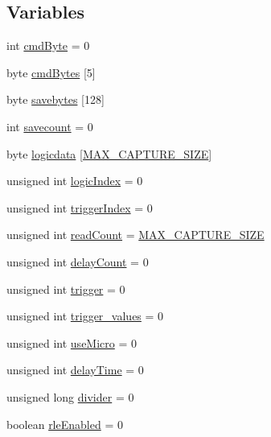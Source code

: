 \subsection*{Variables}
\begin{DoxyCompactItemize}
\item 
int \hyperlink{logic__analyzer_8ino_a12614e45101c87be446e3215f9828ea7}{cmd\-Byte} = 0
\item 
byte \hyperlink{logic__analyzer_8ino_a1c084ba1cb81467fe3909061a10bcc3c}{cmd\-Bytes} \mbox{[}5\mbox{]}
\item 
byte \hyperlink{logic__analyzer_8ino_a244e6b00c44167b679f20c536bbfd847}{savebytes} \mbox{[}128\mbox{]}
\item 
int \hyperlink{logic__analyzer_8ino_a6082b63b4ed702f0c1c36683dfeedffd}{savecount} = 0
\item 
byte \hyperlink{logic__analyzer_8ino_acf1380cc8a402895cf2cbab1a4892637}{logicdata} \mbox{[}\hyperlink{logic__analyzer_8ino_a9fc5489cac12001b6bd8f4327f19d8d3}{M\-A\-X\-\_\-\-C\-A\-P\-T\-U\-R\-E\-\_\-\-S\-I\-Z\-E}\mbox{]}
\item 
unsigned int \hyperlink{logic__analyzer_8ino_a3ebca88c99ad4e7a44e7c1a15f70d7b9}{logic\-Index} = 0
\item 
unsigned int \hyperlink{logic__analyzer_8ino_a5c00415a1614fd9a8ec4d81709ab7a7c}{trigger\-Index} = 0
\item 
unsigned int \hyperlink{logic__analyzer_8ino_ad309c26233a404465e486cc0b1708c8e}{read\-Count} = \hyperlink{logic__analyzer_8ino_a9fc5489cac12001b6bd8f4327f19d8d3}{M\-A\-X\-\_\-\-C\-A\-P\-T\-U\-R\-E\-\_\-\-S\-I\-Z\-E}
\item 
unsigned int \hyperlink{logic__analyzer_8ino_a2d69e43680dd22a35c730441112093a9}{delay\-Count} = 0
\item 
unsigned int \hyperlink{logic__analyzer_8ino_a820e779c394d2a64ab63e7e22420a616}{trigger} = 0
\item 
unsigned int \hyperlink{logic__analyzer_8ino_a494f85c7857b64451b04ff698085f6bf}{trigger\-\_\-values} = 0
\item 
unsigned int \hyperlink{logic__analyzer_8ino_a30066e7c1bf76953fc46a9c9bc1923ab}{use\-Micro} = 0
\item 
unsigned int \hyperlink{logic__analyzer_8ino_a7348932029d885adc020c5d1ddc29274}{delay\-Time} = 0
\item 
unsigned long \hyperlink{logic__analyzer_8ino_ae9918e26621a8ce8e42f3dc43a92c6c9}{divider} = 0
\item 
boolean \hyperlink{logic__analyzer_8ino_ad62ab2989a5832746d168d644991f20a}{rle\-Enabled} = 0
\end{DoxyCompactItemize}


